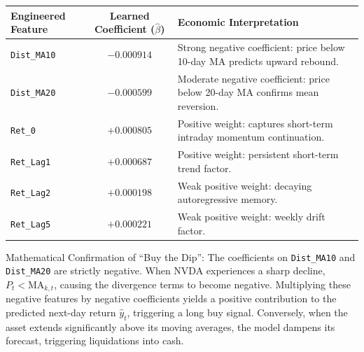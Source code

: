 \documentclass[12pt, a4paper]{article}
\begin{document}
\begin{table}[H]
\centering
\begin{tabular}{l c p{8cm}}
\toprule
\textbf{Engineered Feature} & \textbf{Learned Coefficient} ($\hat{\beta}$) & \textbf{Economic Interpretation} \\
\midrule
\texttt{Dist\_MA10} & $-0.000914$ & Strong negative coefficient: price below 10-day MA predicts upward rebound. \\
\texttt{Dist\_MA20} & $-0.000599$ & Moderate negative coefficient: price below 20-day MA confirms mean reversion. \\
\texttt{Ret\_0} & $+0.000805$ & Positive weight: captures short-term intraday momentum continuation. \\
\texttt{Ret\_Lag1} & $+0.000687$ & Positive weight: persistent short-term trend factor. \\
\texttt{Ret\_Lag2} & $+0.000198$ & Weak positive weight: decaying autoregressive memory. \\
\texttt{Ret\_Lag5} & $+0.000221$ & Weak positive weight: weekly drift factor. \\
\bottomrule
\end{tabular}
\end{table}

Mathematical Confirmation of ``Buy the Dip'':  The coefficients on \texttt{Dist\_MA10} and \texttt{Dist\_MA20} are strictly negative. When NVDA experiences a sharp decline, $P_t < \text{MA}_{k,t}$, causing the divergence terms to become negative. Multiplying these negative features by negative coefficients yields a positive contribution to the predicted next-day return $\hat{y}_t$, triggering a long buy signal. Conversely, when the asset extends significantly above its moving averages, the model dampens its forecast, triggering liquidations into cash.
\end{document}
